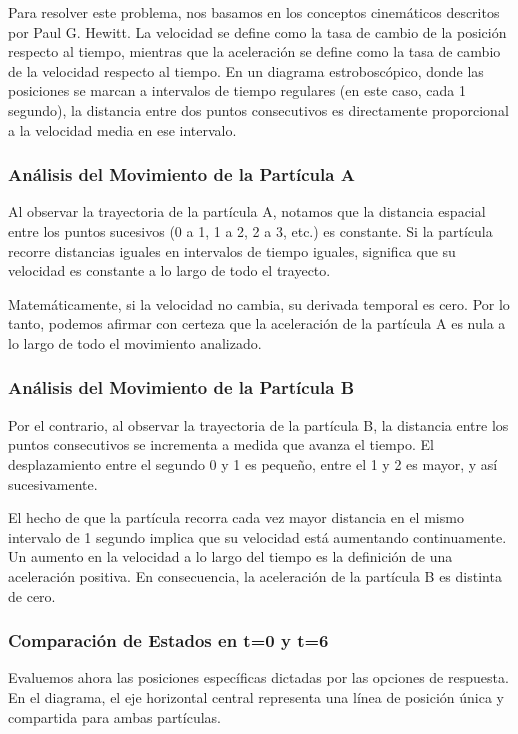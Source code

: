 \documentclass[12pt, a4paper]{article}
\begin{document}
Para resolver este problema, nos basamos en los conceptos cinemáticos descritos por Paul G. Hewitt. La velocidad se define como la tasa de cambio de la posición respecto al tiempo, mientras que la aceleración se define como la tasa de cambio de la velocidad respecto al tiempo. En un diagrama estroboscópico, donde las posiciones se marcan a intervalos de tiempo regulares (en este caso, cada 1 segundo), la distancia entre dos puntos consecutivos es directamente proporcional a la velocidad media en ese intervalo.

\subsubsection*{Análisis del Movimiento de la Partícula A}

Al observar la trayectoria de la partícula A, notamos que la distancia espacial entre los puntos sucesivos (0 a 1, 1 a 2, 2 a 3, etc.) es constante. Si la partícula recorre distancias iguales en intervalos de tiempo iguales, significa que su velocidad es constante a lo largo de todo el trayecto. 

Matemáticamente, si la velocidad no cambia, su derivada temporal es cero. Por lo tanto, podemos afirmar con certeza que la aceleración de la partícula A es nula a lo largo de todo el movimiento analizado.

\subsubsection*{Análisis del Movimiento de la Partícula B}

Por el contrario, al observar la trayectoria de la partícula B, la distancia entre los puntos consecutivos se incrementa a medida que avanza el tiempo. El desplazamiento entre el segundo 0 y 1 es pequeño, entre el 1 y 2 es mayor, y así sucesivamente. 

El hecho de que la partícula recorra cada vez mayor distancia en el mismo intervalo de 1 segundo implica que su velocidad está aumentando continuamente. Un aumento en la velocidad a lo largo del tiempo es la definición de una aceleración positiva. En consecuencia, la aceleración de la partícula B es distinta de cero.

\subsubsection*{Comparación de Estados en t=0 y t=6}

Evaluemos ahora las posiciones específicas dictadas por las opciones de respuesta. En el diagrama, el eje horizontal central representa una línea de posición única y compartida para ambas partículas.
\end{document}
